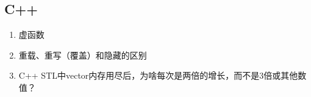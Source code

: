 \documentclass[letterpaper,10pt,english]{sphinxmanual}
\begin{document}
\subsection{C++}
\label{\detokenize{else/01_interview:c}}\begin{enumerate}
\item {} 
虚函数

\end{enumerate}
\begin{quote}

\end{quote}
\begin{enumerate}
\setcounter{enumi}{1}
\item {} 
重载、重写（覆盖）和隐藏的区别

\end{enumerate}
\begin{quote}

\end{quote}
\begin{enumerate}
\setcounter{enumi}{2}
\item {} 
C++ STL中vector内存用尽后，为啥每次是两倍的增长，而不是3倍或其他数值？

\end{enumerate}
\begin{quote}

\end{quote}
\end{document}
